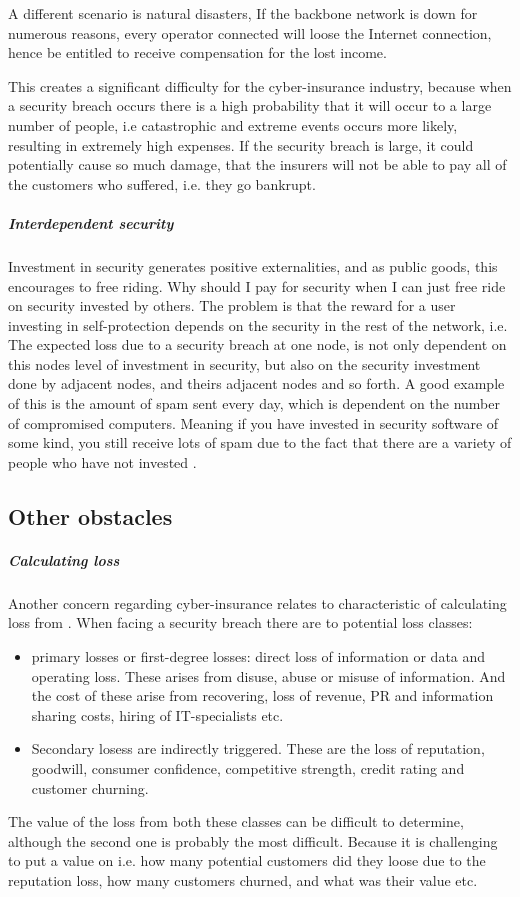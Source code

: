     
  A different scenario is natural disasters, If the backbone network is down for numerous reasons, 
 every operator connected will loose the Internet connection, 
 hence be entitled to receive compensation for the lost income.   
 
This creates a significant difficulty for the cyber-insurance industry, because
when a security breach occurs there is a high probability that it will occur to a large number of people, i.e catastrophic and extreme events occurs more likely, resulting in extremely high expenses.
If the security breach is large, it could potentially cause so much damage, that the insurers will not be able to pay all of the customers who suffered, i.e. they go bankrupt.\cite{bohme2010modeling} 

\subparagraph{Interdependent security}
Investment in security generates positive externalities, and as public goods, this encourages to free riding. Why should I pay for security when I can just free ride on security invested by others.  The problem is that the reward for a user investing in self-protection depends on the security in the rest of the network, i.e. The expected loss due to a security breach at one node, is not only
dependent on this nodes level of investment in security, but also on the security investment done
  by adjacent nodes, and theirs adjacent nodes and so forth. 
  A good example of this is the amount of spam sent every day, which is dependent on the number of compromised computers. Meaning if you have invested in security software of some kind, you still receive lots of spam due to the fact that there are a variety of people who have not invested \cite{towardsInsurable}.

\subsection{Other obstacles}
\subparagraph{Calculating loss} Another concern regarding cyber-insurance relates to characteristic of calculating loss from \cite{mehr1980principles}. When facing a security breach there are to potential loss classes:\cite{bandyopadhyay2009managers} 
\begin{itemize}
\item primary losses or first-degree losses: direct loss of information or data and operating loss. 
These arises from disuse, abuse or misuse of information.
 And the cost of these arise from recovering, loss of revenue, 
 PR and information sharing costs, hiring of IT-specialists etc.
 \item Secondary losess are indirectly triggered. These are the loss of reputation, goodwill, 
consumer confidence, competitive strength, credit rating and customer churning. 
\end{itemize}
The value of the loss from both these classes can be difficult to determine, although the second one is probably the most difficult. Because it is challenging to put a value on i.e. how many potential customers did they loose due to the reputation loss, how many customers churned, and what was their value etc.

